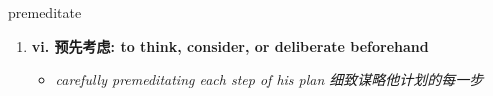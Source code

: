 
\begin{frame}
{\huge premeditate}
\begin{center}
\begin{enumerate}\Large
  \item \textbf{vi. 预先考虑: to think, consider, or deliberate beforehand}
  \begin{itemize}
    \item \em{\Large{carefully premeditating each step of his plan 细致谋略他计划的每一步}}
  \end{itemize}
\end{enumerate}
\end{center}
\end{frame}
